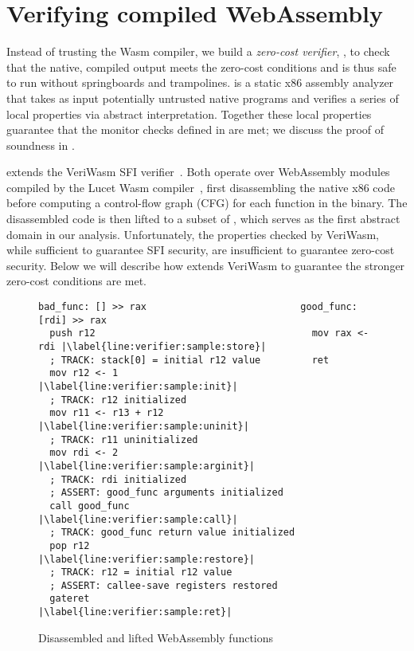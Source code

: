 \section{Verifying compiled WebAssembly}
\label{sec:wasm-verifier}

Instead of trusting the Wasm compiler, we build a \emph{zero-cost verifier},
\verifname{}, to check that the native, compiled output meets the zero-cost
conditions and is thus safe to run without springboards and trampolines.
%
\verifname{} is a static x86 assembly analyzer that takes as input potentially
untrusted native programs and verifies a series of local properties via abstract
interpretation.
%
Together these local properties guarantee that the monitor checks defined in
\olangname{} are met; we discuss the proof of soundness in
.

\verifname{} extends the VeriWasm SFI verifier~\cite{veriwasm}.
%
Both operate over WebAssembly modules compiled by the Lucet Wasm
compiler~\cite{lucet}, first disassembling the native x86 code before computing
a control-flow graph (CFG) for each function in the binary.
%
The disassembled code is then lifted to a subset of \langname{}, which serves as
the first abstract domain in our analysis.
%
Unfortunately, the properties checked by VeriWasm, while sufficient to guarantee
SFI security, are insufficient to guarantee zero-cost security.
%
Below we will describe how \verifname{} extends VeriWasm to guarantee the
stronger zero-cost conditions are met.

\begin{figure}[t]
\begin{lstlisting}[style=asm, escapeinside=||, morekeywords={bad_func:, good_func:}]
bad_func: [] >> rax                           good_func: [rdi] >> rax
  push r12                                      mov rax <- rdi |\label{line:verifier:sample:store}|
  ; TRACK: stack[0] = initial r12 value         ret
  mov r12 <- 1                                                 |\label{line:verifier:sample:init}|
  ; TRACK: r12 initialized
  mov r11 <- r13 + r12                                         |\label{line:verifier:sample:uninit}|
  ; TRACK: r11 uninitialized
  mov rdi <- 2                                                 |\label{line:verifier:sample:arginit}|
  ; TRACK: rdi initialized
  ; ASSERT: good_func arguments initialized
  call good_func                                               |\label{line:verifier:sample:call}|
  ; TRACK: good_func return value initialized
  pop r12                                                      |\label{line:verifier:sample:restore}|
  ; TRACK: r12 = initial r12 value
  ; ASSERT: callee-save registers restored
  gateret                                                      |\label{line:verifier:sample:ret}|
\end{lstlisting}
\caption{Disassembled and lifted WebAssembly functions}
\label{fig:verifier:sample}
\end{figure}

